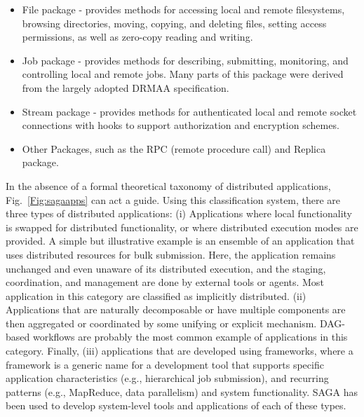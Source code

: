 \documentclass{rspublic}
\begin{document}
\begin{itemize}
\item File package - provides methods for accessing local and remote
 filesystems, browsing directories, moving, copying, and deleting
 files, setting access permissions, as well as zero-copy reading and
 writing.
\item Job package - provides methods for describing, submitting,
 monitoring, and controlling local and remote jobs. Many parts of
 this package were derived from the largely adopted
 DRMAA %
 specification.
\item Stream package - provides methods for authenticated local and
 remote socket connections with hooks to support authorization and
 encryption schemes.
\item Other Packages, such as the RPC (remote procedure call) and Replica
 package.
\end{itemize}

In the absence of a formal theoretical taxonomy of distributed
applications, Fig.~\ref{Fig:sagaapps} can act a guide.  Using this
classification system, there are three types of distributed
applications: (i) Applications where local functionality is swapped
for distributed functionality, or where distributed execution modes
are provided.  A simple but illustrative example is an ensemble of an
application that uses distributed resources for bulk submission. Here,
the application remains unchanged and even unaware of its distributed
execution, and the staging, coordination, and management are done by
external tools or agents. Most application in this category are
classified as implicitly distributed.  (ii) Applications that are
naturally decomposable or have multiple components are then aggregated
or coordinated by some unifying or explicit mechanism.  DAG-based
workflows are probably the most common example of applications in this
category.
Finally, (iii) applications that are developed using frameworks, where
a framework is a generic name for a development tool that supports
specific application characteristics (e.g., hierarchical job
submission), and recurring patterns (e.g., MapReduce, data
parallelism) and system functionality.  SAGA has been used to develop
system-level tools and applications of each of these types.
\end{document}
